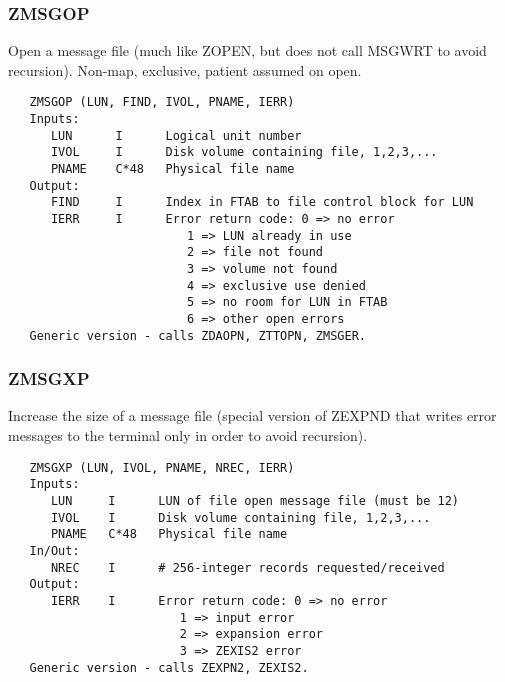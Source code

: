 \subsubsection{ZMSGOP}
Open a message file (much like ZOPEN, but does not call MSGWRT to
avoid recursion).  Non-map, exclusive, patient assumed on open.
\begin{verbatim}
   ZMSGOP (LUN, FIND, IVOL, PNAME, IERR)
   Inputs:
      LUN      I      Logical unit number
      IVOL     I      Disk volume containing file, 1,2,3,...
      PNAME    C*48   Physical file name
   Output:
      FIND     I      Index in FTAB to file control block for LUN
      IERR     I      Error return code: 0 => no error
                         1 => LUN already in use
                         2 => file not found
                         3 => volume not found
                         4 => exclusive use denied
                         5 => no room for LUN in FTAB
                         6 => other open errors
   Generic version - calls ZDAOPN, ZTTOPN, ZMSGER.
\end{verbatim}

\subsubsection{ZMSGXP}
Increase the size of a message file (special version of ZEXPND that
writes error messages to the terminal only in order to avoid
recursion).
\begin{verbatim}
   ZMSGXP (LUN, IVOL, PNAME, NREC, IERR)
   Inputs:
      LUN     I      LUN of file open message file (must be 12)
      IVOL    I      Disk volume containing file, 1,2,3,...
      PNAME   C*48   Physical file name
   In/Out:
      NREC    I      # 256-integer records requested/received
   Output:
      IERR    I      Error return code: 0 => no error
                        1 => input error
                        2 => expansion error
                        3 => ZEXIS2 error
   Generic version - calls ZEXPN2, ZEXIS2.
\end{verbatim}

